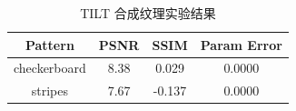 \begin{table}[htbp]
\centering
\caption{TILT 合成纹理实验结果}
\label{tab:chapter6_tilt_synthetic}
\small
\begin{tabular}{|c|c|c|c|}
\hline
Pattern & PSNR & SSIM & Param Error \\
\hline
checkerboard & 8.38 & 0.029 & 0.0000 \\
stripes & 7.67 & -0.137 & 0.0000 \\
\hline
\end{tabular}
\end{table}

